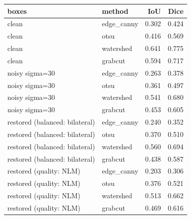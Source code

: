 \begin{tabular}{llrr}
\toprule
boxes & method & IoU & Dice \\
\midrule
clean & edge_canny & 0.302 & 0.424 \\
clean & otsu & 0.416 & 0.569 \\
clean & watershed & 0.641 & 0.775 \\
clean & grabcut & 0.594 & 0.717 \\
noisy sigma=30 & edge_canny & 0.263 & 0.378 \\
noisy sigma=30 & otsu & 0.361 & 0.497 \\
noisy sigma=30 & watershed & 0.541 & 0.680 \\
noisy sigma=30 & grabcut & 0.453 & 0.605 \\
restored (balanced: bilateral) & edge_canny & 0.240 & 0.352 \\
restored (balanced: bilateral) & otsu & 0.370 & 0.510 \\
restored (balanced: bilateral) & watershed & 0.560 & 0.694 \\
restored (balanced: bilateral) & grabcut & 0.438 & 0.587 \\
restored (quality: NLM) & edge_canny & 0.203 & 0.306 \\
restored (quality: NLM) & otsu & 0.376 & 0.521 \\
restored (quality: NLM) & watershed & 0.513 & 0.662 \\
restored (quality: NLM) & grabcut & 0.469 & 0.616 \\
\bottomrule
\end{tabular}
